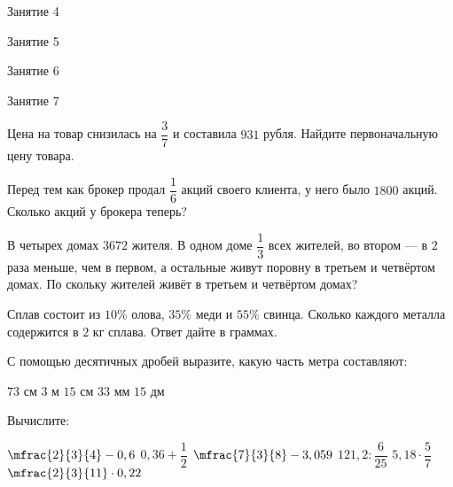 \begin{class}[number=4]
	\begin{listofex}
		\item Занятие 4
	\end{listofex}
\end{class}

\begin{class}[number=5]
	\begin{listofex}
		\item Занятие 5
	\end{listofex}
\end{class}

\begin{class}[number=6]
	\begin{listofex}
		\item Занятие 6
	\end{listofex}
\end{class}

\begin{class}[number=7]
	\begin{listofex}
		\item Занятие 7
	\end{listofex}
\end{class}

\begin{homework}[number=1]
	\begin{listofex}
		\item Цена на товар снизилась на \(\dfrac{3}{7}\) и составила \(931\) рубля. Найдите первоначальную цену товара.
		\item Перед тем как брокер продал \( \dfrac{1}{6} \) акций своего клиента, у него было \(1800\) акций. Сколько акций у брокера теперь?
		\item В четырех домах \(3672\) жителя. В одном доме \(\dfrac{1}{3}\) всех жителей, во втором --- в \(2\) раза меньше, чем в первом, а остальные живут поровну в третьем и четвёртом домах. По скольку жителей живёт в третьем и четвёртом домах?
		\item Сплав состоит из \(10 \%\) олова, \(35\%\) меди и \(55\%\) свинца. Сколько каждого металла содержится в \(2\) кг сплава. Ответ дайте в граммах.
		\item С помощью десятичных дробей выразите, какую часть метра составляют:
		\begin{itasks}[4]
			\task \(73\) см
			\task \(3\) м \(15\) см
			\task \(33\) мм
			\task \(15\) дм
		\end{itasks}
		\item Вычислите:
		\begin{itasks}[3]
			\task \(\mfrac{2}{3}{4}-0,6\) 
			\task \( 0,36+\dfrac{1}{2} \)
			\task \(\mfrac{7}{3}{8}-3,059\)
			\task \(121,2:\dfrac{6}{25}\)
			\task \( 5,18 \cdot \dfrac{5}{7} \) 
			\task \( \mfrac{2}{3}{11} \cdot 0,22 \)
		\end{itasks}
	\end{listofex}
\end{homework}

